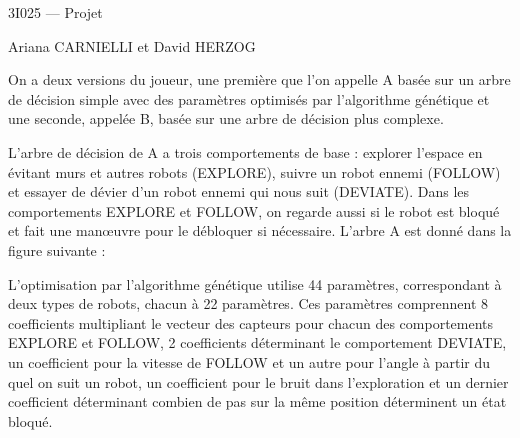 \documentclass[a4paper, 10pt, twoside]{amsart}
\theoremstyle{plain}
\theoremstyle{definition}
\numberwithin{table}{section}
\numberwithin{figure}{section}
\numberwithin{equation}{section}
\begin{document}
\setlength{\parskip}{1pt plus 1pt minus 1pt} %

\pagestyle{plain}


\begin{center}
\LARGE 3I025 --- Projet

\Large Ariana CARNIELLI et David HERZOG
\end{center}

\bigskip

On a deux versions du joueur, une première que l’on appelle A basée sur un arbre de décision simple avec des paramètres optimisés par l’algorithme génétique et une seconde, appelée B, basée sur une arbre de décision plus complexe.

L’arbre de décision de A a trois comportements de base : explorer l’espace en évitant murs et autres robots (EXPLORE), suivre un robot ennemi (FOLLOW) et essayer de dévier d’un robot ennemi qui nous suit (DEVIATE). Dans les comportements EXPLORE et FOLLOW, on regarde aussi si le robot est bloqué et fait une manœuvre pour le débloquer si nécessaire. L’arbre A est donné dans la figure suivante :

L’optimisation par l’algorithme génétique utilise 44 paramètres, correspondant à deux types de robots, chacun à 22 paramètres. Ces paramètres comprennent 8 coefficients multipliant le vecteur des capteurs pour chacun des comportements EXPLORE et FOLLOW, 2 coefficients déterminant le comportement DEVIATE, un coefficient pour la vitesse de FOLLOW et un autre pour l’angle à partir du quel on suit un robot, un coefficient pour le bruit dans l’exploration et un dernier coefficient déterminant combien de pas sur la même position déterminent un état bloqué.
\end{document}
